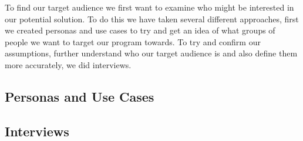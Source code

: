 To find our target audience we first want to examine who might be interested in our potential solution. To do this we have taken several different approaches, first we created personas and use cases to try and get an idea of what groups of people we want to target our program towards. To try and confirm our assumptions, further understand who our target audience is and also define them more accurately, we did interviews.
\subsection{Personas and Use Cases}
\label{UseCases}

\subsection{Interviews}
\label{AudInterview}
